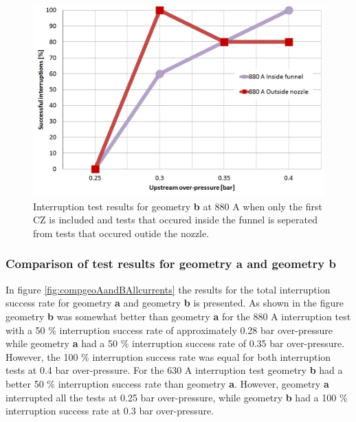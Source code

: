 \documentclass[10pt,b5paper,twoside]{article}
\begin{document}
\begin{figure}[H]
\centering
\includegraphics[scale=0.45]{Bilder/Results/geoB880ampcomp.png}
\caption{Interruption test results for geometry \textbf{b} at 880 A when only the first CZ is included and tests that occured inside the funnel is seperated from tests that occured outide the nozzle.} \label{fig:results880AgeoBcomp}
\end{figure}

\subsubsection{Comparison of test results for geometry \textbf{a} and geometry \textbf{b}}

In figure \ref{fig:compgeoAandBAllcurrents} the results for the total interruption success rate for geometry \textbf{a} and geometry \textbf{b} is presented. As shown in the figure geometry \textbf{b} was somewhat better than geometry \textbf{a} for the 880 A interruption test with a 50 \% interruption success rate of approximately 0.28 bar over-pressure while geometry \textbf{a} had a 50 \% interruption success rate of 0.35 bar over-pressure. However, the 100 \% interruption success rate was equal for both interruption tests at 0.4 bar over-pressure. For the 630 A interruption test geometry \textbf{b} had a better 50 \% interruption success rate than geometry \textbf{a}. However, geometry \textbf{a} interrupted all the tests at 0.25 bar over-pressure, while geometry \textbf{b} had a 100 \% interruption success rate at 0.3 bar over-pressure.
\end{document}
